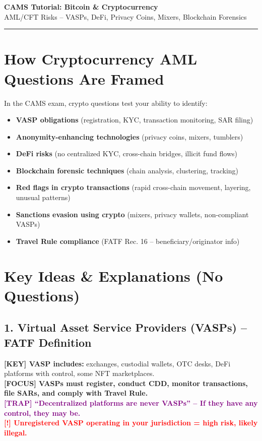 \documentclass[10pt,a4paper]{article}
\newcommand{\redflag}[1]{\textcolor{red}{\textbf{[!] #1}}}
\newcommand{\examfocus}[1]{\textcolor{orange!80!black}{\textbf{[FOCUS] #1}}}
\newcommand{\trap}[1]{\textcolor{purple}{\textbf{[TRAP] #1}}}
\newcommand{\keyterm}[1]{\textcolor{red!80!black}{\textbf{[KEY] #1}}}
\begin{document}
\centering
{\Large \textbf{CAMS Tutorial: Bitcoin \& Cryptocurrency}} \\
{\large AML/CFT Risks – VASPs, DeFi, Privacy Coins, Mixers, Blockchain Forensics} \\
\vspace{0.2cm}
\rule{\textwidth}{0.5pt}
\vspace{0.2cm}

\tiny
\raggedright

\section*{How Cryptocurrency AML Questions Are Framed}
In the CAMS exam, crypto questions test your ability to identify:
\begin{itemize}
\item \textbf{VASP obligations} (registration, KYC, transaction monitoring, SAR filing)
\item \textbf{Anonymity-enhancing technologies} (privacy coins, mixers, tumblers)
\item \textbf{DeFi risks} (no centralized KYC, cross-chain bridges, illicit fund flows)
\item \textbf{Blockchain forensic techniques} (chain analysis, clustering, tracking)
\item \textbf{Red flags in crypto transactions} (rapid cross-chain movement, layering, unusual patterns)
\item \textbf{Sanctions evasion using crypto} (mixers, privacy wallets, non-compliant VASPs)
\item \textbf{Travel Rule compliance} (FATF Rec. 16 – beneficiary/originator info)
\end{itemize}

\section*{Key Ideas \& Explanations (No Questions)}

\subsection*{1. Virtual Asset Service Providers (VASPs) – FATF Definition}
\keyterm{VASP includes:} exchanges, custodial wallets, OTC desks, DeFi platforms with control, some NFT marketplaces. \\
\examfocus{VASPs must register, conduct CDD, monitor transactions, file SARs, and comply with Travel Rule.} \\
\trap{“Decentralized platforms are never VASPs” – If they have any control, they may be.} \\
\redflag{Unregistered VASP operating in your jurisdiction = high risk, likely illegal.}
\end{document}
